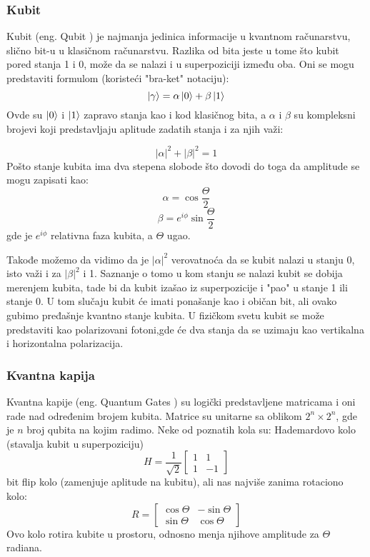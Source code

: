 \documentclass[12pt, letterpaper, oneside]{article}
\begin{document}
\subsubsection*{Kubit}
Kubit (eng. Qubit ) je najmanja jedinica informacije u kvantnom računarstvu, slično bit-u u klasičnom računarstvu.
Razlika od bita jeste u tome što kubit pored stanja 1 i 0, može da se nalazi i u superpoziciji između oba.
Oni se mogu predstaviti formulom (koristeći "bra-ket" notaciju):
\[ \ket{\gamma} =  \alpha\ket{0}+\beta\ket{1} \]
Ovde su $\ket{0}$ i $\ket{1}$ zapravo stanja kao i kod klasičnog bita, a $\alpha$ i $\beta$ su kompleksni brojevi koji predstavljaju aplitude zadatih stanja i za njih važi:

\[ |\alpha|^2+|\beta|^2 = 1 \]
Pošto stanje kubita ima dva stepena slobode što dovodi do toga da amplitude se mogu zapisati kao:
\[
    \alpha = \cos{\frac{\Theta}{2}} 
\]
\[
    \beta = e^{i\phi}\sin{\frac{\Theta}{2}}
\]
gde je $e^{i\phi}$ relativna faza kubita, a $\Theta$ ugao.

Takođe možemo da vidimo da je $|\alpha|^2$ verovatnoća da se kubit nalazi u stanju 0, isto važi i za $ |\beta|^2$ i 1.
Saznanje o tomo u kom stanju se nalazi kubit se dobija merenjem kubita, tade bi da kubit izašao iz superpozicije i "pao" u stanje 1 ili stanje 0. U tom slučaju kubit će imati ponašanje kao i običan bit, ali ovako gubimo pređašnje kvantno stanje kubita.
U fizičkom svetu kubit se može predstaviti kao polarizovani fotoni,gde će dva stanja da se uzimaju kao vertikalna i horizontalna polarizacija.
\subsubsection*{Kvantna kapija}
Kvantna kapije (eng. Quantum Gates ) su logički predstavljene matricama i oni rade nad određenim brojem kubita.
Matrice su unitarne sa oblikom $2^n \times 2^n$, gde je $n$ broj qubita na kojim radimo. Neke od poznatih kola su: Hademardovo kolo (stavalja kubit u superpoziciju)
\[
    H = \frac{1}{\sqrt{2}}\begin{bmatrix}
        1 & 1 \\
        1 & -1
    \end{bmatrix}
\]
bit flip kolo (zamenjuje aplitude na kubitu), ali nas najviše zanima rotaciono kolo:
\[
    R = \begin{bmatrix}
        \cos{\Theta} & -\sin{\Theta} \\
        \sin{\Theta} & \cos{\Theta} 
    \end{bmatrix}
\]
Ovo kolo rotira kubite u prostoru, odnosno menja njihove amplitude za $\Theta$ radiana.
\end{document}
